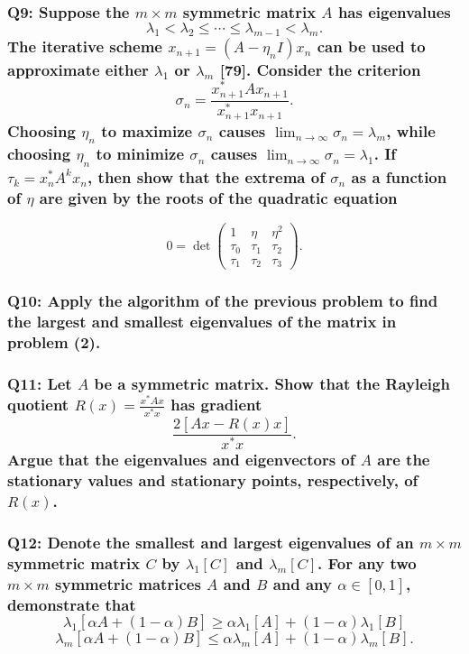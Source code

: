 \documentclass{article}
\begin{document}
\subsubsection*{Q9: Suppose the \(m \times m\) symmetric matrix \(A\) has eigenvalues
\[
\lambda_1 < \lambda_2 \le \cdots \le \lambda_{m-1} < \lambda_m.
\]
The iterative scheme \(x_{n+1} = (A - \eta_n I)x_n\) can be used to approximate either \(\lambda_1\) or \(\lambda_m\) [79]. Consider the criterion
\[
\sigma_n = \frac{x_{n+1}^* A x_{n+1}}{x_{n+1}^* x_{n+1}}.
\]
Choosing \(\eta_n\) to maximize \(\sigma_n\) causes \(\lim_{n \to \infty} \sigma_n = \lambda_m\), while choosing \(\eta_n\) to minimize \(\sigma_n\) causes \(\lim_{n \to \infty} \sigma_n = \lambda_1\). If \(\tau_k = x_n^* A^k x_n\), then show that the extrema of \(\sigma_n\) as a function of \(\eta\) are given by the roots of the quadratic equation}
\[
0 = \det \begin{pmatrix}
1 & \eta & \eta^2 \\
\tau_0 & \tau_1 & \tau_2 \\
\tau_1 & \tau_2 & \tau_3
\end{pmatrix}.
\]

\subsubsection*{Q10: Apply the algorithm of the previous problem to find the largest and smallest eigenvalues of the matrix in problem (2).}

\subsubsection*{Q11: Let \(A\) be a symmetric matrix. Show that the Rayleigh quotient \(R(x) = \frac{x^* A x}{x^* x}\) has gradient
\[
\frac{2[Ax - R(x)x]}{x^* x}.
\]
Argue that the eigenvalues and eigenvectors of \(A\) are the stationary values and stationary points, respectively, of \(R(x)\).}

\subsubsection*{Q12: Denote the smallest and largest eigenvalues of an \(m \times m\) symmetric matrix \(C\) by \(\lambda_1[C]\) and \(\lambda_m[C]\). For any two \(m \times m\) symmetric matrices \(A\) and \(B\) and any \(\alpha \in [0, 1]\), demonstrate that
\[
\lambda_1[\alpha A + (1 - \alpha)B] \geq \alpha \lambda_1[A] + (1 - \alpha) \lambda_1[B]
\]
\[
\lambda_m[\alpha A + (1 - \alpha)B] \leq \alpha \lambda_m[A] + (1 - \alpha) \lambda_m[B].
\]
}
\end{document}
